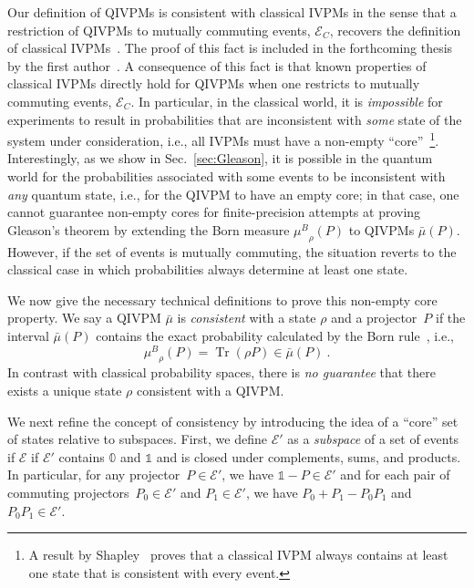 \documentclass[english,reprint, aps, prl,superscriptaddress, showpacs,
showkeys, longbibliography, amsmath, amssymb, floatfix]{revtex4-1}
\theoremstyle{plain}
\theoremstyle{definition}
\newcommand{\events}{\ensuremath{\mathcal{E}}}
\newcommand{\Tr}{\ensuremath{\mathop{\mathrm{Tr}}\nolimits}}
\newcommand{\muB}{\ensuremath{\mu^{B}}}
\newcommand{\eventsC}{\ensuremath{\events_{C}}}
\begin{document}
Our definition of QIVPMs is consistent with classical IVPMs in the
sense that a restriction of QIVPMs to mutually commuting events,
$\eventsC$, recovers the definition of classical
IVPMs~\cite{JamisonLodwick2004}. The proof of this fact is included in the
forthcoming thesis by the first author~\cite{TaiThesis2018}. A
consequence of this fact is that known properties of classical IVPMs
directly hold for QIVPMs when one restricts to mutually commuting
events, $\eventsC$. In particular, in the classical world, it is
\emph{impossible} for experiments to result in probabilities that are
inconsistent with \emph{some} state of the system under consideration,
i.e., all IVPMs must have a non-empty ``core''~\footnote{A result by
  Shapley~\cite{Shapley1971,GilboaSchmeidler1994,NgMoYeh1997,Grabisch2016}
  proves that a classical IVPM always contains at least one state that
  is consistent with every event.}. Interestingly, as we show in
Sec.~\ref{sec:Gleason}, it is possible in the quantum world for the
probabilities associated with some events to be inconsistent with
\emph{any} quantum state, i.e., for the QIVPM to have an empty core;
in that case, one cannot guarantee non-empty cores for finite-precision
attempts at proving Gleason's theorem by extending the Born measure
$\muB_{\rho}\left(P\right)$ to QIVPMs
$\bar{\mu}\left(P\right)$. However, if the set of events is mutually
commuting, the situation reverts to the classical case in which
probabilities always determine at least one state.

We now give the necessary technical definitions to prove this
non-empty core property. We say a QIVPM $\bar{\mu}$ is
\emph{consistent} with a state $\rho$ and a projector~$P$ if the
interval $\bar{\mu}(P)$ contains the exact probability calculated by
the Born rule~\cite{Born1983bibTeX,Mermin2007,Jaeger2007}, i.e.,
  \begin{equation}
  \muB_{\rho}\left(P\right) = \Tr\left(\rho
  P\right)\in\bar{\mu}\left(P\right)\ .
  \end{equation}
In contrast with classical probability spaces, there is \emph{no
guarantee} that there exists a unique state $\rho$ consistent with a QIVPM.

We next refine the concept of consistency by introducing the idea of
a ``core'' set of states relative to subspaces. First, we define
$\events'$ as a \emph{subspace} of a set of events if $\events$ if
$\events'$ contains  $\mathbb{0}$ and $\mathbb{1}$ and is closed under
complements, sums, and products.  In particular, for any
projector~$P\in\events'$, we have
$\mathbb{1}-P\in\events'$ and for each pair of commuting
projectors~$P_{0}\in\events'$ and $P_{1}\in\events'$, we have
$P_{0}+P_{1}-P_{0}P_{1}$ and $P_{0}P_{1}\in\events'$.
\end{document}
